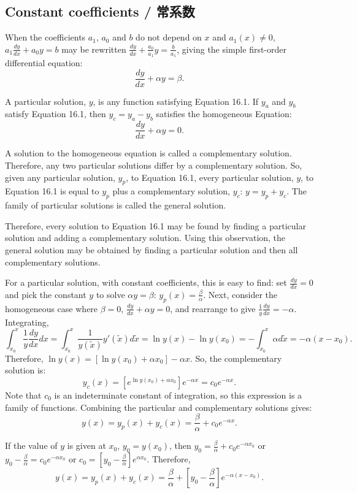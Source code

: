 \subsection{Constant coefficients / 常系数}

\begin{original}
When the coefficients $a_1$, $a_0$ and $b$ do not depend on $x$ and $a_1(x) \neq 0$, $a_1\frac{dy}{dx} + a_0 y = b$ may be rewritten $\frac{dy}{dx} + \frac{a_0}{a_1}y = \frac{b}{a_1}$, giving the simple first-order differential equation:
\[
\frac{dy}{dx} + \alpha y = \beta. \tag{16.1}
\]

A particular solution, $y$, is any function satisfying Equation 16.1. If $y_a$ and $y_b$ satisfy Equation 16.1, then $y_c = y_a - y_b$ satisfies the homogeneous Equation:
\[
\frac{dy}{dx} + \alpha y = 0. \tag{16.2}
\]

A solution to the homogeneous equation is called a complementary solution. Therefore, any two particular solutions differ by a complementary solution. So, given any particular solution, $y_p$, to Equation 16.1, every particular solution, $y$, to Equation 16.1 is equal to $y_p$ plus a complementary solution, $y_c$: $y = y_p + y_c$. The family of particular solutions is called the general solution.

Therefore, every solution to Equation 16.1 may be found by finding a particular solution and adding a complementary solution. Using this observation, the general solution may be obtained by finding a particular solution and then all complementary solutions.

For a particular solution, with constant coefficients, this is easy to find: set $\frac{dy}{dx} = 0$ and pick the constant $y$ to solve $\alpha y = \beta$: $y_p(x) = \frac{\beta}{\alpha}$. Next, consider the homogeneous case where $\beta = 0$, $\frac{dy}{dx} + \alpha y = 0$, and rearrange to give $\frac{1}{y}\frac{dy}{dx} = -\alpha$. Integrating,
\[
\int_{x_0}^{x} \frac{1}{y}\frac{dy}{dx} dx = \int_{x_0}^{x} \frac{1}{y(\tilde{x})} y'(\tilde{x}) d\tilde{x} = \ln y(x) - \ln y(x_0) = -\int_{x_0}^{x} \alpha d\tilde{x} = -\alpha(x - x_0).
\]
Therefore, $\ln y(x) = [\ln y(x_0) + \alpha x_0] - \alpha x$. So, the complementary solution is:
\[
y_c(x) = [e^{\ln y(x_0)+\alpha x_0}]e^{-\alpha x} = c_0 e^{-\alpha x}.
\]
Note that $c_0$ is an indeterminate constant of integration, so this expression is a family of functions. Combining the particular and complementary solutions gives:
\[
y(x) = y_p(x) + y_c(x) = \frac{\beta}{\alpha} + c_0 e^{-\alpha x}. \tag{16.3/16.4}
\]

If the value of $y$ is given at $x_0$, $y_0 = y(x_0)$, then $y_0 = \frac{\beta}{\alpha} + c_0 e^{-\alpha x_0}$ or $y_0 - \frac{\beta}{\alpha} = c_0 e^{-\alpha x_0}$ or $c_0 = \left[y_0 - \frac{\beta}{\alpha}\right] e^{\alpha x_0}$. Therefore,
\[
y(x) = y_p(x) + y_c(x) = \frac{\beta}{\alpha} + \left[y_0 - \frac{\beta}{\alpha}\right] e^{-\alpha(x-x_0)}. \tag{16.5/16.6}
\]
\end{original}
